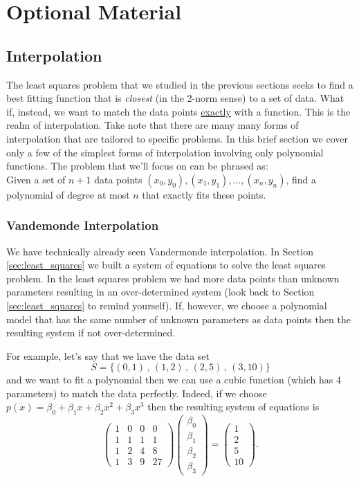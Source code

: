 \chapter{Optional Material}


\section{Interpolation}
The least squares problem that we studied in the previous sections seeks to find a best
fitting function that is {\it closest} (in the 2-norm sense) to a set of data.  What if,
instead, we want to match the data points \underline{exactly} with a function. This is the realm of
interpolation.  Take note that there are many many forms of interpolation that are
tailored to specific problems.  In this brief section we cover only a few of the simplest
forms of interpolation involving only polynomial functions.
The problem that we'll focus on can be phrased as:\\  Given a set of $n+1$ data points $(x_0, y_0), (x_1, y_1), \ldots,
(x_n,y_n)$, find a polynomial of degree at most $n$ that exactly fits these points.
\subsection{Vandemonde Interpolation}
We have technically already seen Vandermonde interpolation.  In Section
\ref{sec:least_squares} we built a system of equations to solve the least squares problem.
In the least squares problem we had more data points than unknown parameters resulting in
an over-determined system (look back to Section \ref{sec:least_squares} to remind
yourself).  If, however, we choose a polynomial model that has the same number of unknown
parameters as data points then the resulting system if not over-determined.

For example, let's say that we have the data set 
\[ S = \{ (0,1) \, , \, (1,2) \, , \, (2,5) \, , \, (3,10) \} \]
and we want to fit a polynomial then we can use a cubic function (which has 4 parameters)
to match the data perfectly.  Indeed, if we choose $p(x) = \beta_0 + \beta_1 x + \beta_2
x^2 + \beta_3 x^3$ then the resulting system of equations is
\[ \begin{pmatrix}  1 & 0 & 0 & 0 \\
                    1 & 1 & 1 & 1 \\
                    1 & 2 & 4 & 8 \\
                    1 & 3 & 9 & 27 \end{pmatrix} \begin{pmatrix} \beta_0 \\ \beta_1 \\
                    \beta_2 \\ \beta_3 \end{pmatrix} = \begin{pmatrix} 1 \\ 2 \\ 5 \\ 10
            \end{pmatrix}. \]

